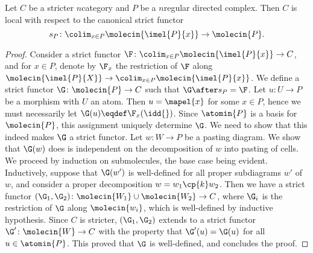 \begin{lem} \label{lem:local_wrt_directed_complexes}
    Let \( C \) be a stricter \( n \)\nbd category and \( P \) be a \( n \)\nbd regular directed complex.
    Then \( C \) is local with respect to the canonical strict functor 
    \begin{equation*}
        s_P \colon \colim_{x \in P} \molecin{\imel{P}{x}} \to \molecin{P}.
    \end{equation*}
\end{lem}
\begin{proof}
    Consider a strict functor \( \F \colon \colim_{x \in P} \molecin{\imel{P}{x}} \to C \), and for \( x \in P \), denote by \( \F_x \) the restriction of \( \F \) along \( \molecin{\imel{P}{X}} \to \colim_{x \in P} \molecin{\imel{P}{x}} \).
    We define a strict functor \( \G \colon \molecin{P} \to C \) such that \( \G \after s_P = \F \).
    Let \( u \colon U \to P \) be a morphism with \( U \) an atom.
    Then \( u = \mapel{x} \) for some \( x \in P \), hence we must necessarily let \( \G(u) \eqdef \F_x(\idd{}) \).
    Since \( \atomin{P} \) is a basis for \( \molecin{P} \), this assignment uniquely determine \( \G \).
    We need to show that this indeed makes \( \G \) a strict functor.
    Let \( w \colon W \to P \) be a pasting diagram.
    We show that \( \G(w) \) does is independent on the decomposition of \( w \) into pasting of cells. 
    We proceed by induction on submolecules, the base case being evident.
    Inductively, suppose that \( \G(w') \) is well-defined for all proper subdiagrams \( w' \) of \( w \), and consider a proper decomposition \( w = w_1 \cp{k} w_2 \).
    Then we have a strict functor \( (\G_1, \G_2) \colon \molecin{W_1} \cup \molecin{W_2} \to C \), where \( \G_i \) is the restriction of \( \G \) along \( \molecin{w_i} \), which is well-defined by inductive hypothesis. 
    Since \( C \) is stricter, \( (\G_1, \G_2) \) extends to a strict functor \( \G' \colon \molecin{W} \to C \) with the property that \( \G'(u) = \G(u) \) for all \( u \in \atomin{P} \).
    This proved that \( \G \) is well-defined, and concludes the proof. 
\end{proof}


